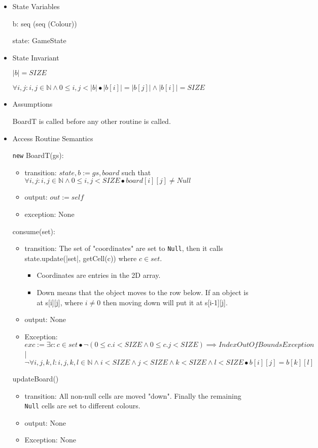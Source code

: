 \documentclass[11pt]{article}
\begin{document}
\begin{itemize}
\item State Variables
\label{sec:org984a062}

b: seq (seq (Colour))

state: GameState

\item State Invariant
\label{sec:org94750e7}

\(|b| = SIZE\)

\(\forall i, j: i, j \in \mathbb{N} \land 0 \leq i,j < |b| \bullet |b[i]| = |b[j]| \land |b[i]| = SIZE\)

\item Assumptions
\label{sec:org7582e48}

BoardT is called before any other routine is called.

\item Access Routine Semantics
\label{sec:orgbdddedf}

\texttt{new} BoardT(gs):
\begin{itemize}
\item transition: \(state, b := gs, board\) such that \(\forall i, j: i,j \in \mathbb{N} \land 0 \leq i,j < SIZE \bullet board[i][j] \neq Null\)
\item output: \(out := self\)
\item exception: None
\end{itemize}


consume(set):
\begin{itemize}
\item transition: The set of "coordinates" are set to \texttt{Null}, then it calls state.update(|set|, getCell(c)) where \(c \in set\).
\begin{itemize}
\item Coordinates are entries in the 2D array.
\item Down means that the object moves to the row below. If an object is at s[i][j], where \(i \neq 0\) then moving down will put it at s[i-1][j].
\end{itemize}
\item output: None
\item Exception: \(exc:= \exists c: c \in set \bullet ¬ (0 \leq c.i < SIZE \land 0\leq c.j < SIZE) \implies IndexOutOfBoundsException\) | \(\lnot \forall i, j ,k, l : i, j, k, l \in \mathbb{N} \land i < SIZE \land j < SIZE \land k < SIZE \land l < SIZE \bullet b[i][j] = b[k][l]\)
\end{itemize}

updateBoard()
\begin{itemize}
\item transition: All non-null cells are moved "down". Finally the remaining \texttt{Null} cells are set to different colours.
\item output: None
\item Exception: None
\end{itemize}


\end{itemize}
\end{document}
